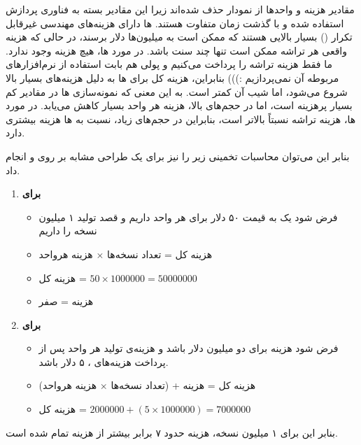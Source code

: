 \begin{qsolve}
	
	مقادیر هزینه و واحدها از نمودار حذف شده‌اند زیرا این مقادیر بسته به فناوری پردازش استفاده شده و با گذشت زمان متفاوت هستند. ها دارای هزینه‌های مهندسی غیرقابل تکرار () بسیار بالایی هستند که ممکن است به میلیون‌ها دلار برسند، در حالی که هزینه واقعی هر تراشه ممکن است تنها چند سنت باشد. در مورد ها، هیچ هزینه  وجود ندارد. ما فقط هزینه تراشه  را پرداخت می‌کنیم و پولی هم بابت استفاده از نرم‌افزار‌های مربوطه آن نمی‌پردازیم :))) بنابراین، هزینه کل برای ها به دلیل هزینه‌های  بسیار بالا شروع می‌شود، اما شیب آن کمتر است. به این معنی که نمونه‌سازی ها در مقادیر کم بسیار پرهزینه است، اما در حجم‌های بالا، هزینه هر واحد بسیار کاهش می‌یابد. در مورد ‌ها، هزینه تراشه نسبتاً بالاتر است، بنابراین در حجم‌های زیاد، نسبت به ‌ها هزینه بیشتری دارد.
	
	بنابر این می‌توان محاسبات تخمینی زیر را نیز برای یک طراحی مشابه بر روی 	و  انجام داد.
\end{qsolve}


\begin{qsolve}
	\begin{enumerate}
		\item 
		\textbf{برای }
		\begin{itemize}
			\item 
			فرض شود یک  به قیمت ۵۰ دلار برای هر واحد داریم و قصد تولید ۱ میلیون نسخه را داریم
			
			\item 
			هزینه کل = تعداد نسخه‌ها $\times$ هزینه هرواحد
			
			\item 
			هزینه کل = $50 \times 1000000 = 50000000 $
			
			\item 
			هزینه  = صفر
			
		\end{itemize}
		
		\item 
		\textbf{برای }
		\begin{itemize}
			\item 
			فرض شود هزینه  برای  دو میلیون دلار باشد و هزینه‌ی تولید هر واحد  پس از پرداخت هزینه‌های ، ۵ دلار باشد.
		\end{itemize}
		
		\begin{itemize}
			\item 
			هزینه کل = هزینه  + (تعداد نسخه‌ها $\times$ هزینه هرواحد)
			
			\item 
			هزینه کل = $2000000 + (5 \times 1000000 ) = 7000000$ 
		\end{itemize}
	\end{enumerate}
	
	
		بنابر این برای ۱ میلیون نسخه، هزینه  حدود ۷ برابر بیشتر از هزینه تمام شده  است.
\end{qsolve}

